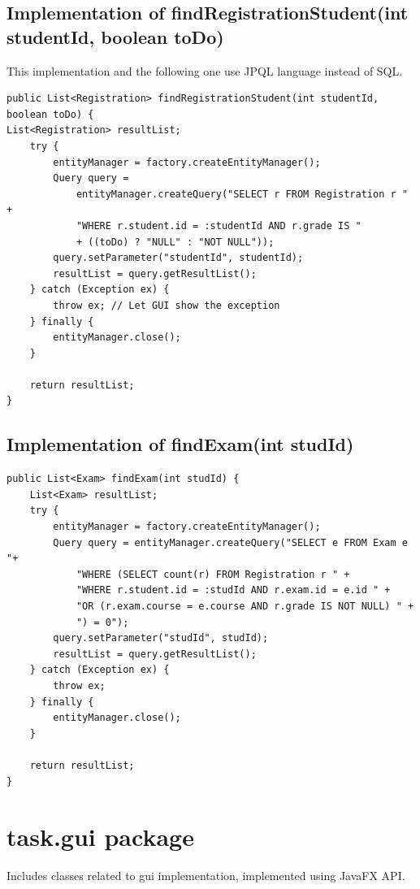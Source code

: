 \documentclass{report}
\begin{document}
\subsection*{Implementation of findRegistrationStudent(int studentId, boolean toDo)}
This implementation and the following one use JPQL language instead of SQL.
\begin{lstlisting}
public List<Registration> findRegistrationStudent(int studentId, boolean toDo) {
List<Registration> resultList;
	try {
		entityManager = factory.createEntityManager();
		Query query =
			entityManager.createQuery("SELECT r FROM Registration r " +
			"WHERE r.student.id = :studentId AND r.grade IS "
			+ ((toDo) ? "NULL" : "NOT NULL"));
		query.setParameter("studentId", studentId);
		resultList = query.getResultList();
	} catch (Exception ex) {
		throw ex; // Let GUI show the exception
	} finally {
		entityManager.close();
	}

	return resultList;
}
\end{lstlisting}

\subsection*{Implementation of findExam(int studId)}
\begin{lstlisting}
public List<Exam> findExam(int studId) {
	List<Exam> resultList;
	try {
		entityManager = factory.createEntityManager();
		Query query = entityManager.createQuery("SELECT e FROM Exam e "+
			"WHERE (SELECT count(r) FROM Registration r " +
			"WHERE r.student.id = :studId AND r.exam.id = e.id " +
			"OR (r.exam.course = e.course AND r.grade IS NOT NULL) " +
			") = 0");
		query.setParameter("studId", studId);
		resultList = query.getResultList();
	} catch (Exception ex) {
		throw ex;
	} finally {
		entityManager.close();
	}

	return resultList;
}
\end{lstlisting}

\section*{task.gui package}
Includes classes related to gui implementation, implemented using JavaFX API.
\end{document}
